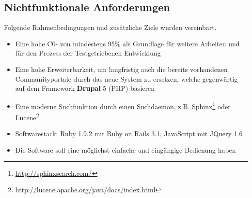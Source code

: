 \subsection{Nichtfunktionale Anforderungen}
Folgende Rahmenbedingungen und zusätzliche Ziele wurden vereinbart.

\begin{itemize}
 \item Eine hohe C0- von mindestens 95\% als Grundlage für weitere Arbeiten und für den Prozess der Testgetriebenen Entwicklung
 \item Eine hohe Erweiterbarkeit, um langfristig auch die bereits vorhandenen Communityportale durch das neue System zu ersetzen, welche gegenwärtig auf dem Framework \textbf{Drupal} 5 (PHP) basieren
 \item Eine moderne Suchfunktion durch einen Suchdaemon, z.B. Sphinx\footnote{\url{http://sphinxsearch.com/}} oder Lucene\footnote{\url{http://lucene.apache.org/java/docs/index.html}}
 \item Softwarestack: Ruby 1.9.2 mit Ruby on Rails 3.1, JavaScript mit JQuery 1.6
 \item Die Software soll eine möglichst einfache und eingängige Bedienung haben
\end{itemize}

